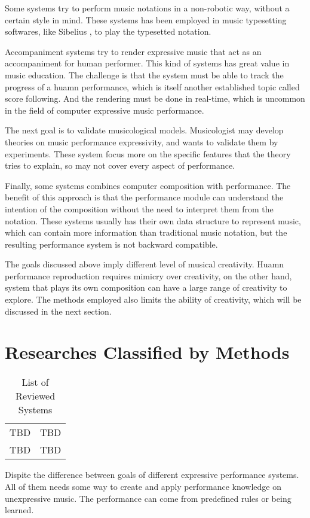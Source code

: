 Some systems try to perform music notations in a non-robotic way, without a certain style in mind. These systems has been employed in music typesetting softwares, like Sibelius \cite{sibelius}, to play the typesetted notation. 

Accompaniment systems try to render expressive music that act as an accompaniment for human performer. This kind of systems has great value in music education. The challenge is that the system must be able to track the progress of a huamn performance, which is itself another established topic called score following. And the rendering must be done in real-time, which is uncommon in the field of computer expressive music performance.

The next goal is to validate musicological models. Musicologist may develop theories on music performance expressivity, and wants to validate them by experiments. These system focus more on the specific features that the theory tries to explain, so may not cover every aspect of performance.

Finally, some systems combines computer composition with performance. The benefit of this approach is that the performance module can understand the intention of the composition without the need to interpret them from the notation. These systems usually has their own data structure to represent music, which can contain more information than traditional music notation, but the resulting performance system is not backward compatible.

The goals discussed above imply different level of musical creativity. Huamn performance reproduction requires mimicry over creativity, on the other hand, system that plays its own composition can have a large range of creativity to explore. The methods employed also limits the ability of creativity, which will be discussed in the next section.


\section{Researches Classified by Methods}
\begin{table}
   \centering
   \begin{tabular}{|c|c|}
      TBD & TBD\\
      TBD & TBD\\
   \end{tabular}
   \caption{List of Reviewed Systems}
   \label{tab:prevworks}
\end{table}
Dispite the difference between goals of different expressive performance systems. All of them needs some way to create and apply performance knowledge on unexpressive music. The performance can come from predefined rules or being learned. 

